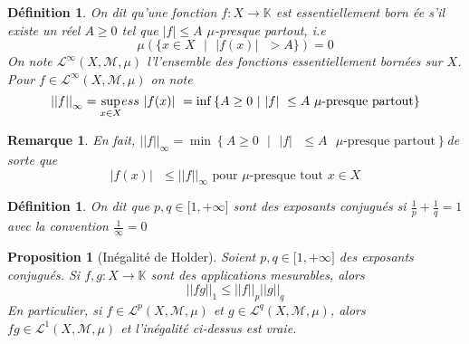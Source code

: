 \documentclass[3pt]{article}
\newtheorem{definition}[theorem]{D\'{e}finition}
\newtheorem{proposition}[theorem]{Proposition}
\newtheorem{remark}[theorem]{Remarque}
\begin{document}
\begin{definition}
On dit qu'une fonction $f:X\rightarrow \mathbb{K}$ est essentiellement born%
\'{e}e s'il existe un r\'{e}el $A\geq 0$ tel que $\left\vert f\right\vert
\leq A$ $\mu $-presque partout, i.e%
\begin{equation*}
\mu (\{x\in X\text{ }|\text{ }|f(x)|\text{ }>A\})=0
\end{equation*}%
On note $\mathcal{L}^{\infty }(X,\mathcal{M},\mu )$ l'l'ensemble des
fonctions essentiellement born\'{e}es sur $X$. Pour $f\in \mathcal{L}%
^{\infty }(X,\mathcal{M},\mu )$ on note 
\begin{equation*}
\left\vert \left\vert f\right\vert \right\vert _{\infty }=\underset{x\in X}{%
\sup }ess\text{ }|f(x)|\text{ }=\inf \left\{ A\geq 0\text{ }|\text{ }|f|%
\text{ }\leq A\text{ }\mu \text{-presque partout}\right\} 
\end{equation*}
\end{definition}

\bigskip 

\begin{remark}
En fait, $\left\vert \left\vert f\right\vert \right\vert _{\infty }=\min
\left\{ A\geq 0\text{ }|\text{ }|f|\text{ }\leq A\text{ }\mu \text{-presque
partout}\right\} $de sorte que%
\begin{equation*}
|f(x)|\text{ }\leq \left\vert \left\vert f\right\vert \right\vert _{\infty }%
\text{ pour }\mu \text{-presque tout }x\in X
\end{equation*}
\end{remark}

\bigskip 

\begin{definition}
On dit que $p,q\in \lbrack 1,+\infty ]$ sont des exposants conjugu\'{e}s si $%
\frac{1}{p}+\frac{1}{q}=1$ avec la convention $\frac{1}{\infty }=0$
\end{definition}

\bigskip 

\begin{proposition}[In\'{e}galit\'{e} de Holder]
Soient $p,q\in \lbrack 1,+\infty ]$ des exposants conjugu\'{e}s. Si $%
f,g:X\rightarrow \mathbb{K}$ sont des applications mesurables, alors%
\begin{equation*}
\left\vert \left\vert fg\right\vert \right\vert _{1}\leq \left\vert
\left\vert f\right\vert \right\vert _{p}\left\vert \left\vert g\right\vert
\right\vert _{q}
\end{equation*}%
En particulier, si $f\in \mathcal{L}^{p}(X,\mathcal{M},\mu )$ et $g\in 
\mathcal{L}^{q}(X,\mathcal{M},\mu )$, alors $fg\in \mathcal{L}^{1}(X,%
\mathcal{M},\mu )$ et l'in\'{e}galit\'{e} ci-dessus est vraie.
\end{proposition}
\end{document}
